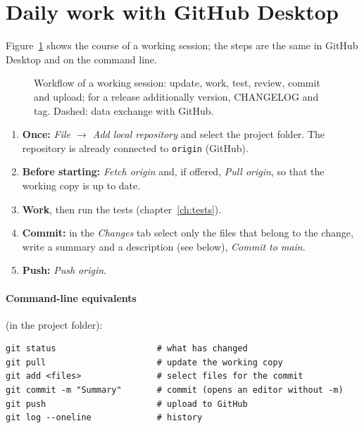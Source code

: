 \section{Daily work with GitHub Desktop}

Figure~\ref{fig:git-workflow} shows the course of a working session; the
steps are the same in GitHub Desktop and on the command line.

\begin{figure}[htbp]
  \centering
  
  \caption{Workflow of a working session: update, work, test, review,
           commit and upload; for a release additionally version,
           CHANGELOG and tag. Dashed: data exchange with GitHub.}
  \label{fig:git-workflow}
\end{figure}

\begin{enumerate}
  \item \textbf{Once:} \emph{File $\rightarrow$ Add local repository}
        and select the project folder. The repository is already
        connected to \texttt{origin} (GitHub).
  \item \textbf{Before starting:} \emph{Fetch origin} and, if offered,
        \emph{Pull origin}, so that the working copy is up to date.
  \item \textbf{Work}, then run the tests (chapter~\ref{ch:tests}).
  \item \textbf{Commit:} in the \emph{Changes} tab select only the files
        that belong to the change, write a summary and a description
        (see below), \emph{Commit to main}.
  \item \textbf{Push:} \emph{Push origin}.
\end{enumerate}

\paragraph*{Command-line equivalents} (in the project folder):
\begin{lstlisting}[basicstyle=\ttfamily\footnotesize, frame=single]
git status                    # what has changed
git pull                      # update the working copy
git add <files>               # select files for the commit
git commit -m "Summary"       # commit (opens an editor without -m)
git push                      # upload to GitHub
git log --oneline             # history
\end{lstlisting}

